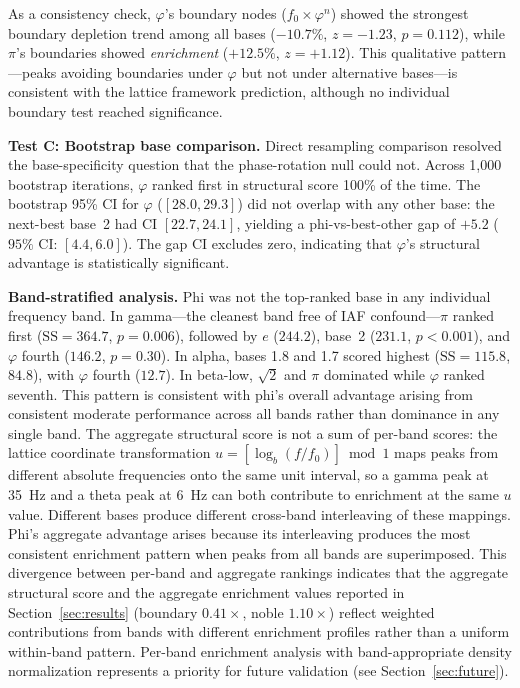 \documentclass[11pt,a4paper]{article}
\newcommand{\phisym}{\varphi}
\newcommand{\fzero}{f_0}
\begin{document}
As a consistency check, $\phisym$'s boundary nodes ($\fzero \times \phisym^n$) showed the strongest boundary depletion trend among all bases ($-10.7\%$, $z = -1.23$, $p = 0.112$), while $\pi$'s boundaries showed \emph{enrichment} ($+12.5\%$, $z = +1.12$). This qualitative pattern---peaks avoiding boundaries under $\phisym$ but not under alternative bases---is consistent with the lattice framework prediction, although no individual boundary test reached significance.

\textbf{Test C: Bootstrap base comparison.} Direct resampling comparison resolved the base-specificity question that the phase-rotation null could not. Across 1,000 bootstrap iterations, $\phisym$ ranked first in structural score 100\% of the time. The bootstrap 95\% CI for $\phisym$ ($[28.0, 29.3]$) did not overlap with any other base: the next-best base~2 had CI $[22.7, 24.1]$, yielding a phi-vs-best-other gap of $+5.2$ ($95\%$ CI: $[4.4, 6.0]$). The gap CI excludes zero, indicating that $\phisym$'s structural advantage is statistically significant.

\textbf{Band-stratified analysis.} Phi was not the top-ranked base in any individual frequency band. In gamma---the cleanest band free of IAF confound---$\pi$ ranked first ($\text{SS} = 364.7$, $p = 0.006$), followed by $e$ ($244.2$), base~2 ($231.1$, $p < 0.001$), and $\phisym$ fourth ($146.2$, $p = 0.30$). In alpha, bases 1.8 and 1.7 scored highest ($\text{SS} = 115.8$, $84.8$), with $\phisym$ fourth ($12.7$). In beta-low, $\sqrt{2}$ and $\pi$ dominated while $\phisym$ ranked seventh. This pattern is consistent with phi's overall advantage arising from consistent moderate performance across all bands rather than dominance in any single band. The aggregate structural score is not a sum of per-band scores: the lattice coordinate transformation $u = [\log_b(f/\fzero)] \bmod 1$ maps peaks from different absolute frequencies onto the same unit interval, so a gamma peak at 35~Hz and a theta peak at 6~Hz can both contribute to enrichment at the same $u$ value. Different bases produce different cross-band interleaving of these mappings. Phi's aggregate advantage arises because its interleaving produces the most consistent enrichment pattern when peaks from all bands are superimposed. This divergence between per-band and aggregate rankings indicates that the aggregate structural score and the aggregate enrichment values reported in Section~\ref{sec:results} (boundary $0.41\times$, noble $1.10\times$) reflect weighted contributions from bands with different enrichment profiles rather than a uniform within-band pattern. Per-band enrichment analysis with band-appropriate density normalization represents a priority for future validation (see Section~\ref{sec:future}).
\end{document}
